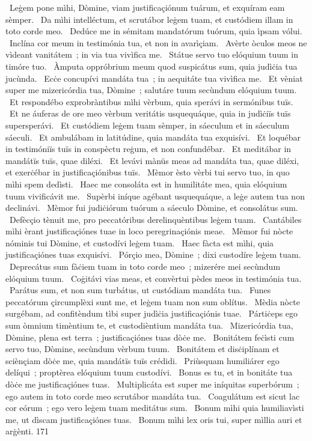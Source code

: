 {~Leġem pone mìhi, Dòmine, viam justificaçiónum tuárum, et exquíram eam sèmper.
~Da mìhi intelléctum, et scrutábor leġem tuam, et custódiem illam in toto corde meo.
~Dedúce me in sémitam mandatórum tuórum, quia ìpsam vólui.
~Inclína cor meum in testimónia tua, et non in avarìçiam.
~Avèrte òculos meos ne vìdeant vanitátem~; in via tua vivìfica me.
~Státue servo tuo elóquium tuum in timóre tuo.
~Àmputa oppróbrium meum quod suspicátus sum, quia judìċia tua jucùnda.
~Ecċe concupívi mandáta tua~; in aequitáte tua vivìfica me.
~Et vèniat super me mizericórdia tua, Dòmine~; salutáre tuum secùndum elóquium tuum.
~Et respondébo exprobràntibus mìhi vèrbum, quia sperávi in sermónibus tuïs.
~Et ne áuferas de ore meo vèrbum veritátis usquequáque, quia in judìċiïs tuïs supersperávi.
~Et custódiem leġem tuam sèmper, in sáeculum et in sáeculum sáeculi.
~Et ambulábam in latitúdine, quia mandáta tua exquisívi.
~Et loquébar in testimóniïs tuïs in conspèctu reġum, et non confundébar.
~Et meditábar in mandátïs tuïs, quae diléxi.
~Et levávi mànüs meas ad mandáta tua, quae diléxi, et exerċébar in justificaçiónibus tuïs.
~Mèmor èsto vèrbi tui servo tuo, in quo mìhi spem dedìsti.
~Haec me consoláta est in humilitáte mea, quia elóquium tuum vivificávit me.
~Supèrbi iníque agébant usquequáque, a leġe autem tua non declinávi.
~Mèmor fui judiċiórum tuórum a sáeculo Dòmine, et consolátus sum.
~Defècçio tènuit me, pro peccatóribus derelinquèntibus leġem tuam.
~Cantábiles mìhi èrant justificaçiónes tuae in loco peregrinaçiónis meae.
~Mèmor fui nòcte nóminis tui Dòmine, et custodívi leġem tuam.
~Haec fàcta est mìhi, quia justificaçiónes tuas exquisívi.
~Pórçio mea, Dòmine~; dixi custodíre leġem tuam.
~Deprecátus sum fàċiem tuam in toto corde meo~; mizerére mei secùndum elóquium tuum.
~Coġitávi vias meas, et convèrtui pèdes meos in testimónia tua.
~Parátus sum, et non sum turbátus, ut custódiam mandáta tua.
~Funes peccatórum çircumplèxi sunt me, et leġem tuam non sum oblítus.
~Mèdia nòcte surgébam, ad confitèndum tìbi super judìċia justificaçiónis tuae.
~Pártiċeps ego sum òmnium timèntium te, et custodièntium mandáta tua.
~Mizericórdia tua, Dòmine, plena est terra~; justificaçiónes tuas dòċe me.
~Bonitátem feċìsti cum servo tuo, Dòmine, secùndum vèrbum tuum.
~Bonitátem et disċiplínam et sciènçiam dòċe me, quia mandátïs tuïs crédidi.
~Priùsquam humiliárer ego delíqui~; proptèrea elóquium tuum custodívi.
~Bonus es tu, et in bonitáte tua dòċe me justificaçiónes tuas.
~Multiplicáta est super me iníquitas superbórum~; ego autem in toto corde meo scrutábor mandáta tua.
~Coagulátum est sicut lac cor eórum~; ego vero leġem tuam meditátus sum.
~Bonum mìhi quia humiliavìsti me, ut dìscam justificaçiónes tuas.
~Bonum mìhi lex oris tui, super mìllia auri et arġènti.}
{17}{1}

